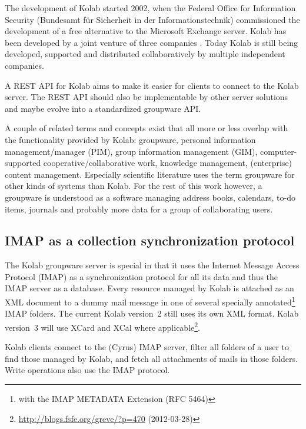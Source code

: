 \documentclass[11pt,a4paper,headsepline,twoside]{scrartcl}		%
\newcommand{\citeurl}[2]{\url{#1} (#2)}
\begin{document}
The development of Kolab started 2002, when the Federal Office for Information
Security (Bundesamt für Sicherheit in der Informationstechnik) commissioned the
development of a free alternative to the Microsoft Exchange server. Kolab has
been developed by a joint venture of three companies \cite{Stoermer2004}. Today
Kolab is still being developed, supported and distributed collaboratively by
multiple independent companies.

A REST API for Kolab aims to make it easier for clients to connect to the Kolab
server. The REST API should also be implementable by other server solutions and
maybe evolve into a standardized groupware API.

A couple of related terms and concepts exist that all more or less overlap with
the functionality provided by Kolab: groupware, personal information
management/manager (PIM), group information management (GIM), computer-supported
cooperative/collaborative work, knowledge management, (enterprise) content
management. Especially scientific literature uses the term groupware for other
kinds of systems than Kolab\cite[sec. 2.1]{Stoermer2004}. For the rest of this
work however, a groupware is understood as a software managing address books,
calendars, to-do items, journals and probably more data for a group of
collaborating users.

\subsection{IMAP as a collection synchronization protocol}
\label{sec:imap-as-collection}

The Kolab groupware server is special in that it uses the Internet Message
Access Protocol (IMAP) as a synchronization protocol for all its data and thus
the IMAP server as a database. Every resource managed by Kolab is attached as an
XML document to a dummy mail message in one of several specially
annotated\footnote{with the IMAP METADATA Extension (RFC 5464)} IMAP
folders. The current Kolab version~2 still uses its own XML format. Kolab
version~3 will use XCard and XCal where
applicable\footnote{\citeurl{http://blogs.fsfe.org/greve/?p=470}{2012-03-28}}.

Kolab clients connect to the (Cyrus) IMAP server, filter all folders of a user
to find those managed by Kolab, and fetch all attachments of mails in those
folders. Write operations also use the IMAP protocol.
\end{document}
